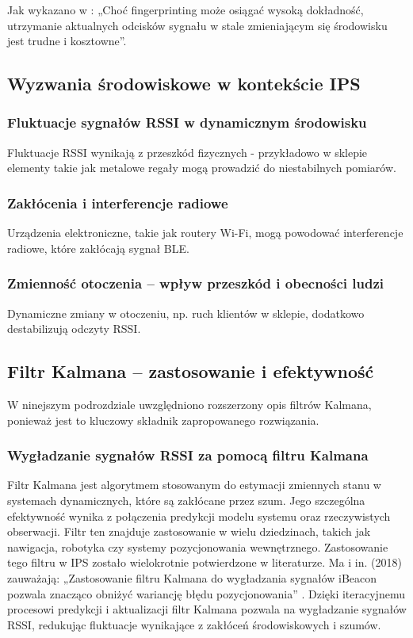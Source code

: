 Jak wykazano w \cite{Liu2007}: „Choć fingerprinting może osiągać wysoką dokładność, utrzymanie aktualnych odcisków sygnału w stale zmieniającym się środowisku jest trudne i kosztowne”.

\subsection{Wyzwania środowiskowe w kontekście IPS}

\subsubsection{Fluktuacje sygnałów RSSI w dynamicznym środowisku}
Fluktuacje RSSI wynikają z przeszkód fizycznych - przykładowo w sklepie elementy takie jak metalowe regały mogą prowadzić do niestabilnych pomiarów.

\subsubsection{Zakłócenia i interferencje radiowe}
Urządzenia elektroniczne, takie jak routery Wi-Fi, mogą powodować interferencje radiowe, które zakłócają sygnał BLE.

\subsubsection{Zmienność otoczenia – wpływ przeszkód i obecności ludzi}
Dynamiczne zmiany w otoczeniu, np. ruch klientów w sklepie, dodatkowo destabilizują odczyty RSSI.

\subsection{Filtr Kalmana – zastosowanie i efektywność}
W ninejszym podrozdziale uwzględniono rozszerzony opis  filtrów Kalmana, ponieważ jest to kluczowy składnik zapropowanego rozwiązania.
\subsubsection{Wygładzanie sygnałów RSSI za pomocą filtru Kalmana}

Filtr Kalmana jest algorytmem stosowanym do estymacji zmiennych stanu w systemach dynamicznych, które są zakłócane przez szum. Jego szczególna efektywność wynika z połączenia predykcji modelu systemu oraz rzeczywistych obserwacji. Filtr ten znajduje zastosowanie w wielu dziedzinach, takich jak nawigacja, robotyka czy systemy pozycjonowania wewnętrznego. Zastosowanie tego filtru w IPS zostało wielokrotnie potwierdzone w literaturze. Ma i in. (2018) zauważają: „Zastosowanie filtru Kalmana do wygładzania sygnałów iBeacon pozwala znacząco obniżyć wariancję błędu pozycjonowania” \cite{Ma2018}.
Dzięki iteracyjnemu procesowi predykcji i aktualizacji filtr Kalmana pozwala na wygładzanie sygnałów RSSI, redukując fluktuacje wynikające z zakłóceń środowiskowych i szumów.

